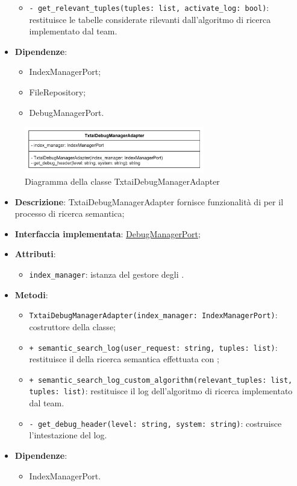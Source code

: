 \begin{itemize}
\begin{itemize}
        \item \texttt{- get\_relevant\_tuples(tuples: list, activate\_log: bool)}: restituisce le tabelle considerate rilevanti dall'algoritmo di ricerca implementato dal team.
    \end{itemize}
    \item \textbf{Dipendenze}:
    \begin{itemize}
        \item IndexManagerPort;
        \item FileRepository;
        \item DebugManagerPort.
    \end{itemize}
\end{itemize} 

 \label{TxtaiDebugManagerAdapter}
\begin{figure}[H]
    \centering
    \includegraphics[width=0.7\textwidth]{assets/Backend/txtai_debug_manager_adapter.png}
    \caption{Diagramma della classe TxtaiDebugManagerAdapter}
  \end{figure}
\begin{itemize}
    \item \textbf{Descrizione}: TxtaiDebugManagerAdapter fornisce funzionalità di  per il processo di ricerca semantica;
    \item \textbf{Interfaccia implementata}: \hyperref[DebugManagerPort]{DebugManagerPort};
    \item \textbf{Attributi}:
    \begin{itemize}
        \item \texttt{index\_manager}: istanza del gestore degli .
    \end{itemize}
    \item \textbf{Metodi}:
    \begin{itemize}
        \item \texttt{TxtaiDebugManagerAdapter(index\_manager: IndexManagerPort)}: costruttore della classe;
        \item \texttt{+ semantic\_search\_log(user\_request: string, tuples: list)}: restituisce il  della ricerca semantica effettuata con ;
        \item \texttt{+ semantic\_search\_log\_custom\_algorithm(relevant\_tuples: list, tuples: list)}: restituisce il log dell'algoritmo di ricerca implementato dal team.
        \item \texttt{- get\_debug\_header(level: string, system: string)}: costruisce l'intestazione del log.
    \end{itemize}
    \item \textbf{Dipendenze}:
    \begin{itemize}
        \item IndexManagerPort.
    \end{itemize}
\end{itemize} 

